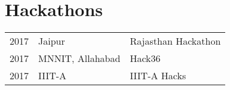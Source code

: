 \documentclass[]{deedy-resume-openfont}
\begin{document}
\begin{minipage}[t]{0.66\textwidth}
\section{Hackathons} 
\begin{tabular}{rll}
2017	     & Jaipur  & Rajasthan Hackathon\\
2017	     & MNNIT, Allahabad  		& Hack36\\
2017	     & IIIT-A  		& IIIT-A Hacks\\
\end{tabular}
\sectionsep


\end{minipage} 
\end{document}
